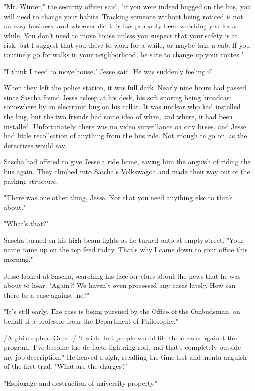 "Mr. Winter," the security officer said, "if you were indeed bugged on the bus, you will need to change your habits.  Tracking someone without being noticed is not an easy business, and whoever did this has probably been watching you for a while.  You don't need to move house unless you suspect that your safety is at risk, but I suggest that you drive to work for a while, or maybe take a cab.  If you routinely go for walks in your neighborhood, be sure to change up your routes."

"I think I need to move house," Jesse said.  He was suddenly feeling ill.


When they left the police station, it was full dark.  Nearly nine hours had passed since Sascha found Jesse asleep at his desk, his soft snoring being broadcast somewhere by an electronic bug on his collar.  It was unclear who had installed the bug, but the two friends had some idea of when, and where, it had been installed.  Unfortunately, there was no video surveillance on city buses, and Jesse had little recollection of anything from the bus ride.  Not enough to go on, as the detectives would say.

Sascha had offered to give Jesse a ride home, saving him the anguish of riding the bus again.  They climbed into Sascha's Volkswagon and made their way out of the parking structure.

"There was one other thing, Jesse.  Not that you need anything else to think about."

"What's that?"

Sascha turned on his high-beam lights as he turned onto at empty street.  "Your name came up on the top feed today.  That's why I came down to your office this morning."

Jesse looked at Sascha, searching his face for clues about the news that he was about to hear.  "Again?!  We haven't even processed any cases lately.  How can there be a case against me?"

"It's still early.  The case is being pursued by the Office of the Ombudsman, on behalf of a professor from the Department of Philosophy."

/A philosopher.  Great./  "I wish that people would file these cases against the program.  I've become the de facto lightning rod, and that's completely outside my job description."  He heaved a sigh, recalling the time lost and menta anguish of the first trial.  "What are the charges?"

"Espionage and destruction of university property."


